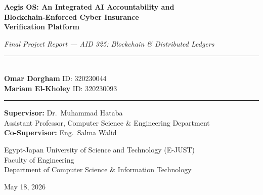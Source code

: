 \documentclass[12pt,a4paper]{article}
\begin{document}

\begin{titlepage}
  \thispagestyle{empty}
  \centering
  \vspace*{1.5cm}

  {\LARGE\bfseries Aegis OS: An Integrated AI Accountability and\\[6pt]
  Blockchain-Enforced Cyber Insurance\\[6pt]
  Verification Platform\par}

  \vspace{0.6cm}
  {\large\itshape Final Project Report --- AID 325: Blockchain \& Distributed Ledgers\par}

  \vspace{1.5cm}
  \rule{0.6\linewidth}{0.4pt}\\[0.6cm]
  {\large
    \textbf{Omar Dorgham} \quad ID: 320230044\\[4pt]
    \textbf{Mariam El-Kholey} \quad ID: 320230093
  }\\[0.6cm]
  \rule{0.6\linewidth}{0.4pt}

  \vspace{1.2cm}
  {\normalsize
    \textbf{Supervisor:} Dr.\ Muhammad Hataba\\
    Assistant Professor, Computer Science \& Engineering Department\\[6pt]
    \textbf{Co-Supervisor:} Eng.\ Salma Walid
  }

  \vspace{1.2cm}
  {\normalsize
    Egypt-Japan University of Science and Technology (E-JUST)\\
    Faculty of Engineering\\
    Department of Computer Science \& Information Technology
  }

  \vfill
  {\large May 18, 2026}
\end{titlepage}

\clearpage
{}
\end{document}
